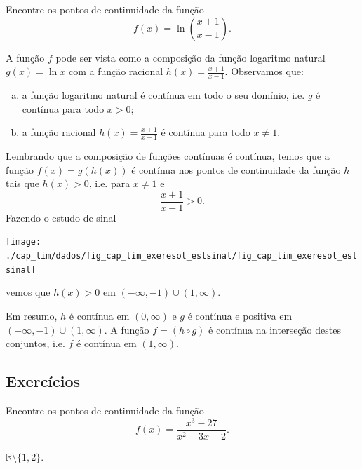 \begin{exeresol}
  Encontre os pontos de continuidade da função
  \begin{equation}
    f(x) = \ln\left(\frac{x+1}{x-1}\right).
  \end{equation}
\end{exeresol}
\begin{resol}
  A função $f$ pode ser vista como a composição da função logaritmo natural $g(x) = \ln x$ com a função racional $\displaystyle h(x) = \frac{x+1}{x-1}$. Observamos que:
  \begin{enumerate}[a)]
  \item a função logaritmo natural é contínua em todo o seu domínio, i.e. $g$ é contínua para todo $x > 0$;
  \item a função racional $\displaystyle h(x) = \frac{x+1}{x-1}$ é contínua para todo $x\neq 1$.
  \end{enumerate}
  Lembrando que a composição de funções contínuas é contínua, temos que a função $f(x) = g(h(x))$ é contínua nos pontos de continuidade da função $h$ tais que $h(x) > 0$, i.e. para $x\neq 1$ e
  \begin{equation}
    \frac{x+1}{x-1} > 0.
  \end{equation}
  Fazendo o estudo de sinal
  \begin{center}
    \texttt{[image: ./cap\_lim/dados/fig\_cap\_lim\_exeresol\_estsinal/fig\_cap\_lim\_exeresol\_estsinal]}
  \end{center}
  vemos que $h(x) > 0$ em $(-\infty, -1)\cup (1, \infty)$.

  Em resumo, $h$ é contínua em $(0, \infty)$ e $g$ é contínua e positiva em $(-\infty, -1)\cup (1, \infty)$. A função $f = (h\circ g)$ é contínua na interseção destes conjuntos, i.e. $f$ é contínua em $(1, \infty)$. 
\end{resol}

\subsection{Exercícios}


\begin{exer}
  Encontre os pontos de continuidade da função
  \begin{equation}
    f(x) = \frac{x^3 - 27}{x^2 - 3x + 2}.
  \end{equation}
\end{exer}
\begin{resp}
  $\mathbb{R}\setminus\{1,2\}$.
\end{resp}

